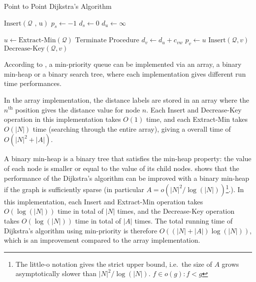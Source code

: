 \begin{algorithm}[H]
    \caption{Point to Point Dijkstra's Algorithm}
    \label{algo:p2pdijkstra}
    \begin{algorithmic}[1]
        \State $\text{Insert}(\mathcal{Q}\text{ , u})$ 
        \State $p_s \gets -1$ 
        \State $d_s \gets 0$
         
        \State $d_u \gets \infty$
    \EndFor

    \State $ u \gets \text{Extract-Min}(\mathcal{Q}) $ 
    \State $\text{Terminate Procedure}$ 
\EndIf
 
\State $d_v \gets d_u + c_{vw}$
\State $p_v \gets u$
\State $\text{Insert}(\mathcal{Q}, v)$ 
\Else
\State $\text{Decrease-Key}(\mathcal{Q}, v)$ 
    \EndIf
\EndIf
                \EndFor
            \EndIf
        \EndWhile
    \EndProcedure
\end{algorithmic}
\end{algorithm}

According to \citet{Cormen},
a min-priority queue can be implemented via an array, a binary min-heap or a binary search tree,
where each implementation gives different run time performances.

In the array implementation,
the distance labels are stored in an array where the $n^{\text{th}}$ position gives the distance value for node $n$.
Each Insert and Decrease-Key operation in this implementation takes $O(1)$ time, and each Extract-Min takes $O(|N|)$ time (searching through the entire array), giving a overall time of $O(|N|^2 + |A|)$.

A binary min-heap is a binary tree that satisfies the min-heap property:
the value of each node is smaller or equal to the value of its child nodes.
\citet{Cormen} shows that the performance of the Dijkstra's algorithm can be improved with a binary min-heap if the graph is sufficiently sparse (in particular $A = o(|N|^2/\log(|N|))$\footnote{The little-o notation gives the strict upper bound, i.e.\ the size of $A$ grows asymptotically slower than $|N|^2/\log(|N|)$. $f \in o(g) : f < g$}.).
In this implementation, each Insert and Extract-Min operation takes $O(\log(|N|))$ time in total of $|N|$ times,
and the Decrease-Key operation takes $O(\log(|N|))$ time in total of $|A|$ times.
The total running time of Dijkstra's algorithm using min-priority is therefore $O((|N|+|A|)\log(|N|))$,
which is an improvement compared to the array implementation.

